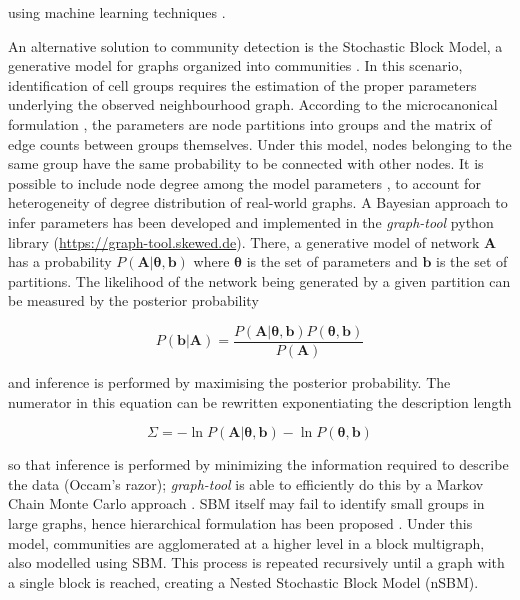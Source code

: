 \documentclass[10pt]{article}
\begin{document}
using machine learning techniques \cite{miao_2020}.

An alternative solution to community detection is the Stochastic Block Model, a generative model for graphs organized into communities \cite{holland_1983}. In this scenario, identification of cell groups requires the estimation of the proper parameters underlying the observed neighbourhood graph. According to the microcanonical formulation \cite{peixoto_2017}, the parameters are node partitions into groups and the matrix of edge counts between groups themselves. Under this model, nodes belonging to the same group have the same probability to be connected with other nodes. It is possible to include node degree among the model parameters \cite{karrer_2011}, to account for heterogeneity of degree distribution of real-world graphs. A Bayesian approach to infer parameters has been developed \cite{peixoto_2013} and implemented in the \emph{graph-tool} python library (\href{https://graph-tool.skewed.de}{https:/\slash graph-tool.skewed.de}). There, a generative model of network $\boldsymbol A$ has a probability $P(\boldsymbol A|\boldsymbol\theta, \boldsymbol b)$ where \textbf{$\boldsymbol\theta$} is the set of parameters and \textbf{\emph{$\boldsymbol b$}} is the set of partitions. The likelihood of the network being generated by a given partition can be measured by the posterior probability


\begin{MPEquation}[!ht]
\begin{equation}
P(\boldsymbol b | \boldsymbol A) = \frac{P(\boldsymbol A|\boldsymbol\theta, \boldsymbol b)P(\boldsymbol\theta, \boldsymbol b)}{P(\boldsymbol A)}
\end{equation}
\label{MPEquationElement:820CB015-E51E-4C5A-BD9C-70E667B8F73B}
\end{MPEquation}
and inference is performed by maximising the posterior probability. The numerator in this equation can be rewritten exponentiating the description length


\begin{MPEquation}[!ht]
\begin{equation}
\Sigma = -\ln P(\boldsymbol A|\boldsymbol\theta, \boldsymbol b) - \ln P(\boldsymbol\theta, \boldsymbol b)
\end{equation}
\label{MPEquationElement:676396C0-2D6F-4084-89B1-951DE3032087}
\end{MPEquation}

so that inference is performed by minimizing the information required to describe the data (Occam's razor); \emph{graph-tool} is able to efficiently do this by a Markov Chain Monte Carlo approach \cite{peixoto_2014}. SBM itself may fail to identify small groups in large graphs, hence hierarchical formulation has been proposed \cite{peixoto_2014_h}. Under this model, communities are agglomerated at a higher level in a block multigraph, also modelled using SBM. This process is repeated recursively until a graph with a single block is reached, creating a Nested Stochastic Block Model (nSBM).
\end{document}
